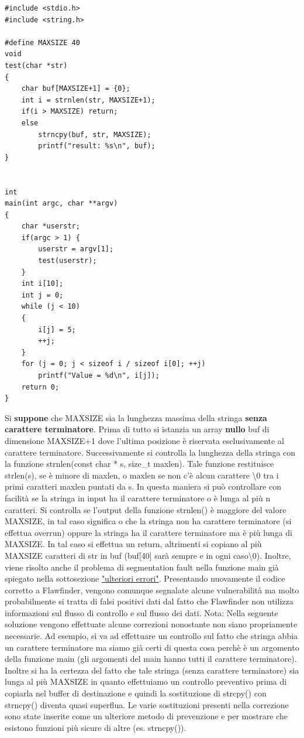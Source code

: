 \documentclass[11pt]{article} %
\begin{document}
\begin{lstlisting}
#include <stdio.h>
#include <string.h>

#define	MAXSIZE	40
void
test(char *str)
{
	char buf[MAXSIZE+1] = {0};
	int i = strnlen(str, MAXSIZE+1);
	if(i > MAXSIZE) return;
	else
	    strncpy(buf, str, MAXSIZE);
	    printf("result: %s\n", buf);
}


int
main(int argc, char **argv)
{
	char *userstr;
	if(argc > 1) {
		userstr = argv[1];
		test(userstr);
	}
	int i[10];
	int j = 0;
	while (j < 10)
	{
		i[j] = 5;
		++j;
	}
	for (j = 0; j < sizeof i / sizeof i[0]; ++j)
		printf("Value = %d\n", i[j]);
	return 0;
}
\end{lstlisting} \newpage
Si \textbf{suppone} che MAXSIZE sia la lunghezza massima della stringa \textbf{senza carattere terminatore}. Prima di tutto si istanzia un array \textbf{nullo} buf di dimensione MAXSIZE+1 dove l'ultima posizione è riservata esclusivamente al carattere terminatore. Successivamente si controlla la lunghezza della stringa con la funzione strnlen(const char * s, size\_t maxlen). Tale funzione restituisce strlen(s), se è minore di maxlen, o maxlen se non c'è alcun carattere \textbackslash0 tra i primi caratteri maxlen puntati da s. In questa maniera si può controllare con facilità se la stringa in input ha il carattere terminatore o è lunga al più n caratteri. Si controlla se l'output della funzione strnlen() è maggiore del valore MAXSIZE, in tal caso significa o che la stringa non ha carattere terminatore (si effettua overrun) oppure la stringa ha il carattere terminatore ma è più lunga di MAXSIZE. In tal caso si effettua un return, altrimenti si copiano al più MAXSIZE caratteri di str in buf (buf[40] sarà sempre e in ogni caso\textbackslash0). \newline
Inoltre, viene risolto anche il problema di segmentation fault nella funzione main già spiegato nella sottosezione \hyperref[sec:err]{"ulteriori errori"}. \newline
Presentando nuovamente il codice corretto a Flawfinder, vengono comunque segnalate alcune vulnerabilità ma molto probabilmente si tratta di falsi positivi dati dal fatto che Flawfinder non utilizza informazioni sul flusso di controllo e sul flusso dei dati. \newline \newline
Nota: Nella seguente soluzione vengono effettuate alcune correzioni nonostante non siano propriamente necessarie. Ad esempio, si va ad effettuare un controllo sul fatto che stringa abbia un carattere terminatore ma siamo già certi di questa cosa perchè è un argomento della funzione main (gli argomenti del main hanno tutti il carattere terminatore). Inoltre si ha la certezza del fatto che tale stringa (senza carattere terminatore) sia lunga al più MAXSIZE in quanto effettuiamo un controllo preventivo prima di copiarla nel buffer di destinazione e quindi la sostituzione di strcpy() con strncpy() diventa quasi superflua. Le varie sostituzioni presenti nella correzione sono state inserite come un ulteriore metodo di prevenzione e per mostrare che esistono funzioni più sicure di altre (es. strncpy()).
\end{document}
